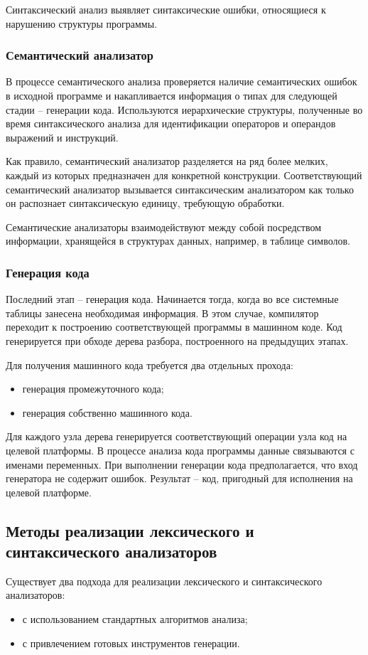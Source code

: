 Синтаксический анализ выявляет синтаксические ошибки, относящиеся к нарушению структуры программы. \\

\subsubsection{Семантический анализатор}
В процессе семантического анализа проверяется наличие семантических ошибок в исходной программе и накапливается информация о типах для следующей стадии -- генерации кода. Используются иерархические структуры, полученные во время синтаксического анализа для идентификации операторов и операндов выражений и инструкций. 

Как правило, семантический анализатор разделяется на ряд более мелких, каждый из которых предназначен для конкретной конструкции. Соответствующий семантический анализатор вызывается синтаксическим анализатором как только он распознает синтаксическую единицу, требующую обработки.

Семантические анализаторы взаимодействуют между собой посредством информации, хранящейся в структурах данных, например, в таблице символов.

\subsubsection{Генерация кода}
Последний этап -- генерация кода. Начинается тогда, когда во все системные таблицы занесена необходимая информация. В этом случае, компилятор переходит к построению соответствующей программы в машинном коде. Код генерируется при обходе дерева разбора, построенного на предыдущих этапах. 

Для получения машинного кода требуется два отдельных прохода:
\begin{itemize}
	\item генерация промежуточного кода;
	
	\item генерация собственно машинного кода.
\end{itemize}

Для каждого узла дерева генерируется соответствующий операции узла код на целевой платформы. В процессе анализа кода программы данные связываются с именами переменных. При выполнении генерации кода предполагается, что вход генератора не содержит ошибок. Результат -- код, пригодный для исполнения на целевой платформе. \\

\subsection{Методы реализации лексического и синтаксического анализаторов}
Существует два подхода для реализации лексического и синтаксического анализаторов:
\begin{itemize}
	\item с использованием стандартных алгоритмов анализа;
	
	\item с привлечением готовых инструментов генерации. \\
\end{itemize}

